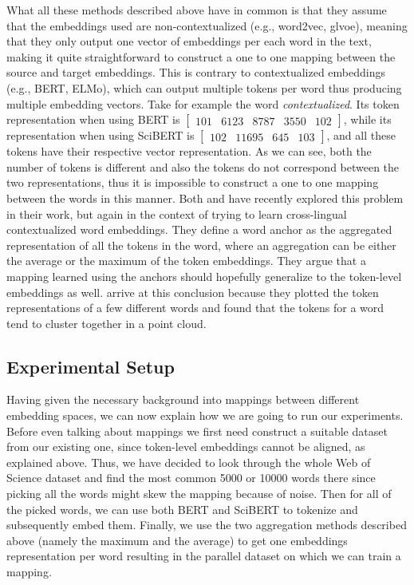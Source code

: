 \documentclass[12pt]{extreport}
\begin{document}
What all these methods described above have in common is that they assume that the embeddings used are non-contextualized (e.g., word2vec, glvoe), meaning that they only output one vector of embeddings per each word in the text, making it quite straightforward to construct a one to one mapping between the source and target embeddings. This is contrary to contextualized embeddings (e.g., BERT, ELMo), which can output multiple tokens per word thus producing multiple embedding vectors. Take for example the word \emph{contextualized}. Its token representation when using BERT is $\begin{bmatrix} 101 & 6123 & 8787 & 3550 & 102 \end{bmatrix}$, while its representation when using SciBERT is $\begin{bmatrix} 102 & 11695 & 645 & 103 \end{bmatrix}$, and all these tokens have their respective vector representation. As we can see, both the number of tokens is different and also the tokens do not correspond between the two representations, thus it is impossible to construct a one to one mapping between the words in this manner. Both \cite{crosslingual} and \cite{investigating-cross-lingual} have recently explored this problem in their work, but again in the context of trying to learn cross-lingual contextualized word embeddings. They define a word anchor as the aggregated representation of all the tokens in the word, where an aggregation can be either the average or the maximum of the token embeddings. They argue that a mapping learned using the anchors should hopefully generalize to the token-level embeddings as well. \cite{crosslingual} arrive at this conclusion because they plotted the token representations of a few different words and found that the tokens for a word tend to cluster together in a point cloud.

\subsection{Experimental Setup}

Having given the necessary background into mappings between different embedding spaces, we can now explain how we are going to run our experiments. Before even talking about mappings we first need construct a suitable dataset from our existing one, since token-level embeddings cannot be aligned, as explained above. Thus, we have decided to look through the whole Web of Science dataset and find the most common 5000 or 10000 words there since picking all the words might skew the mapping because of noise. Then for all of the picked words, we can use both BERT and SciBERT to tokenize and subsequently embed them. Finally, we use the two aggregation methods described above (namely the maximum and the average) to get one embeddings representation per word resulting in the parallel dataset on which we can train a mapping.
\end{document}
